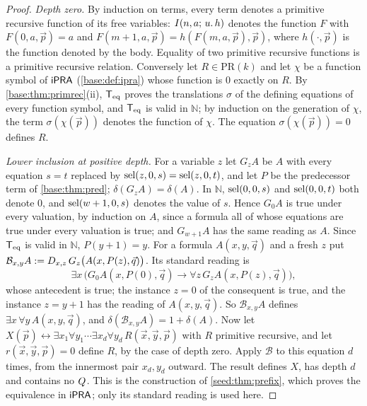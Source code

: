 \begin{proof}
\emph{Depth zero.}  By induction on terms, every term denotes a primitive
recursive function of its free variables: $I(n,a;\,u.\,h)$ denotes the
function $F$ with $F(0,a,\vec p)=a$ and
$F(m+1,a,\vec p)=h(F(m,a,\vec p),\vec p)$, where $h(\cdot,\vec p)$ is the
function denoted by the body.  Equality of two primitive recursive functions
is a primitive recursive relation.  Conversely let $R\in\mathrm{PR}(k)$ and
let $\chi$ be a function symbol of $\mathsf{iPRA}$ (\cref{base:def:ipra}) whose
function is $0$ exactly on $R$.  By \cref{base:thm:primrec}(ii), $\mathsf{T}_{\mathrm{eq}}$
proves the translations $\sigma$ of the defining equations of every
function symbol, and $\mathsf{T}_{\mathrm{eq}}$ is valid in $\mathbb N$; by induction on the
generation of $\chi$, the term $\sigma(\chi(\vec p))$ denotes the function
of $\chi$.  The equation $\sigma(\chi(\vec p))=0$ defines $R$.

\emph{Lower inclusion at positive depth.}  For a variable $z$ let $G_zA$ be
$A$ with every equation $s=t$ replaced by $\operatorname{sel}(z,0,s)=\operatorname{sel}(z,0,t)$, and let
$P$ be the predecessor term of \cref{base:thm:pred}; $\delta(G_zA)=\delta(A)$.
In $\mathbb N$, $\operatorname{sel}(0,0,s)$ and $\operatorname{sel}(0,0,t)$ both denote $0$, and
$\operatorname{sel}(w+1,0,s)$ denotes the value of $s$.  Hence $G_0A$ is true under every
valuation, by induction on $A$, since a formula all of whose equations are
true under every valuation is true; and $G_{w+1}A$ has the same reading as
$A$.  Since $\mathsf{T}_{\mathrm{eq}}$ is valid in $\mathbb N$, $P(y+1)=y$.  For a formula
$A(x,y,\vec q)$ and a fresh $z$ put
$\mathcal B_{x,y}A\mathrel{:=}D_{x,z}\,G_z\bigl(A(x,P(z),\vec q)\bigr)$.  Its
standard reading is
\[
 \exists x\,\bigl(G_0A(x,P(0),\vec q)\to\forall z\,G_zA(x,P(z),\vec q)\bigr),
\]
whose antecedent is true; the instance $z=0$ of the consequent is true, and
the instance $z=y+1$ has the reading of $A(x,y,\vec q)$.  So
$\mathcal B_{x,y}A$ defines $\exists x\,\forall y\,A(x,y,\vec q)$, and
$\delta(\mathcal B_{x,y}A)=1+\delta(A)$.  Now let
$X(\vec p)\leftrightarrow\exists x_1\forall y_1\cdots\exists x_d\forall y_d\,
R(\vec x,\vec y,\vec p)$ with $R$ primitive recursive, and let
$r(\vec x,\vec y,\vec p)=0$ define $R$, by the case of depth zero.  Apply
$\mathcal B$ to this equation $d$ times, from the innermost pair
$x_d,y_d$ outward.  The result defines $X$, has depth $d$ and contains no
$Q_{}$.  This is the construction of \cref{seed:thm:prefix}, which proves
the equivalence in $\mathsf{iPRA}$; only its standard reading is used here.


\end{proof}
